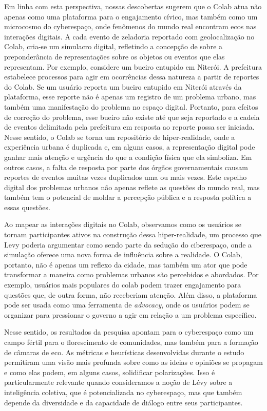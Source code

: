 Em linha com esta perspectiva, nossas descobertas sugerem que o Colab atua não apenas como uma plataforma para o engajamento cívico, mas também como um microcosmo do cyberespaço, onde fenômenos do mundo real encontram ecos nas interações digitais. A cada evento de zeladoria reportado com geolocalização no Colab, cria-se um simulacro digital, refletindo a concepção de  sobre a preponderância de representações sobre os objetos ou eventos que elas representam. Por exemplo, considere um bueiro entupido em Niterói. A prefeitura estabelece processos para agir em ocorrências dessa natureza a partir de reportes do Colab. Se um usuário reporta um bueiro entupido em Niterói através da plataforma, esse reporte não é apenas um registro de um problema urbano, mas também uma manifestação do problema no espaço digital. Portanto, para efeitos de correção do problema, esse bueiro não existe até que seja reportado e a cadeia de eventos delimitada pela prefeitura em resposta ao reporte possa ser iniciada. Nesse sentido, o Colab se torna um repositório de hiper-realidade, onde a experiência urbana é duplicada e, em alguns casos, a representação digital pode ganhar mais atenção e urgência do que a condição física que ela simboliza. Em outros casos, a falta de resposta por parte dos órgãos governamentais causam reportes de eventos muitas vezes duplicados uma ou mais vezes. Este espelho digital dos problemas urbanos não apenas reflete as questões do mundo real, mas também tem o potencial de moldar a percepção pública e a resposta política a essas questões.

Ao mapear as interações digitais no Colab, observamos como os usuários se tornam participantes ativos na construção dessa hiper-realidade, um processo que Levy poderia argumentar como sendo parte da sedução do ciberespaço, onde a simulação oferece uma nova forma de influência sobre a realidade. O Colab, portanto, não é apenas um reflexo da cidade, mas também um ator que pode transformar a maneira como problemas urbanos são percebidos e abordados. Por exemplo, usuários mais populares do colab podem trazer engajamento para questões que, de outra forma, não receberiam atenção. Além disso, a plataforma pode ser usada como uma ferramenta de \textit{advocacy}, onde os usuários podem se organizar para pressionar o governo a agir em relação a um problema específico.

Nesse sentido, os resultados da pesquisa apontam para o cyberespaço como um campo fértil para o florescimento de comunidades, mas também para a formação de câmaras de eco. As métricas e heurísticas desenvolvidas durante o estudo permitiram uma visão mais profunda sobre como as ideias e opiniões se propagam e como elas podem, em alguns casos, solidificar polarizações. Isso é particularmente relevante quando consideramos a noção de Lévy sobre a inteligência coletiva, que é potencializada no cyberespaço, mas que também depende da diversidade e da capacidade de diálogo entre seus participantes.

